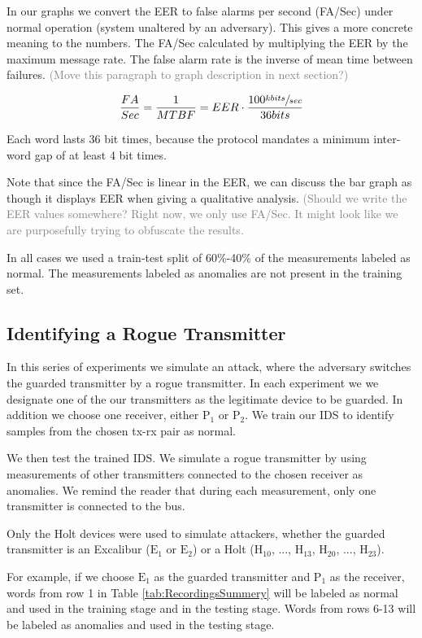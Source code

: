 \documentclass[conference]{IEEEtran}
\begin{document}
   In our graphs we convert the EER to false alarms per second (FA/Sec) under normal operation (system unaltered by an adversary). This gives a more concrete meaning to the numbers. The FA/Sec calculated by multiplying the EER by the maximum message rate. The false alarm rate is the inverse of mean time between failures. \textcolor{gray}{(Move this paragraph to graph description in next section?)}
  
  \[\frac{FA}{Sec} = \frac{1}{MTBF} = EER \cdot \frac{100 \sfrac{kbits}{sec}}{36bits}\]
  
  Each word lasts 36 bit times, because the protocol mandates a minimum inter-word gap of at least 4 bit times.
  
  Note that since the FA/Sec is linear in the EER, we can discuss the bar graph as though it displays EER when giving a qualitative analysis. \textcolor{gray}{(Should we write the EER values somewhere? Right now, we only use FA/Sec. It might look like we are purposefully trying to obfuscate the results.}
  
  In all cases we used a train-test split of 60\%-40\% of the measurements labeled as normal. The measurements labeled as anomalies are not present in the training set.
  
\subsection{Identifying a Rogue Transmitter}
  In this series of experiments we simulate an attack, where the adversary switches the guarded transmitter by a rogue transmitter. In each experiment we we designate one of the our transmitters as the legitimate device to be guarded. In addition we choose one receiver, either \(\text{P}_1\) or \(\text{P}_2\).  We train our IDS to identify samples from the chosen tx-rx pair as normal.
  
  We then test the trained IDS. We simulate a rogue transmitter by using measurements of other transmitters connected to the chosen receiver as anomalies. We remind the reader that during each measurement, only one transmitter is connected to the bus.
  
  Only the Holt devices were used to simulate attackers, whether the guarded transmitter is an Excalibur (\(\text{E}_1\) or \(\text{E}_2\)) or a Holt (\(\text{H}_{10}\), ..., \(\text{H}_{13}\), \(\text{H}_{20}\), ..., \(\text{H}_{23}\)).
  
  For example, if we choose \(\text{E}_1\) as the guarded transmitter and \(\text{P}_1\) as the receiver, words from row 1 in Table \ref{tab:RecordingsSummery} will be labeled as normal and used in the training stage and in the testing stage. Words from rows 6-13 will be labeled as anomalies and used in the testing stage.
  
\end{document}
